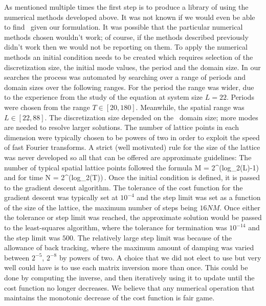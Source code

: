 As mentioned multiple times the first step is to produce a library of \twots using the numerical methods developed above.
It was not known if we would even be able to find \twots\ given our formulation. It was
possible that the particular numerical methods chosen wouldn't work; of course, if the methods
described previously didn't work then we would not be reporting on them. To apply the numerical methods
an initial condition needs to be created which requires selection of the discretization size, the initial mode values,
the period and the domain size. In our searches the process was automated by searching over a range
of periods and domain sizes over the following ranges. For the period the range was wider, due to the
experience from the study of the equation at system size $L=22$. Periods were chosen from the range
$T\in [20, 180]$. Meanwhile, the spatial range was $L \in [22, 88]$. The discretization size
depended on the \spt\ domain size; more modes are needed to resolve larger solutions. The number
of lattice points in each dimension were typically chosen to be powers of two in order to exploit
the speed of fast Fourier transforms. A strict (well motivated) rule for the size of the lattice
was never developed so all that can be offered are approximate guidelines: The number of typical
spatial lattice points followed the formula
\beq
M = 2^{(log_2(L)-1)}
\eeq
and for time
\beq
N = 2^{(log_2(T))}\,.
\eeq
Once the initial condition is defined, it is passed to the gradient descent algorithm.
The tolerance of the cost function for the gradient descent was typically set at $10^{-4}$
and the step limit was set as a function of the size of the lattice, the maximum number of
steps being $16NM$. Once either the tolerance or step limit was reached, the approximate
solution would be passed to the least-squares algorithm, where the tolerance for termination
was $10^{-14}$ and the step limit was $500$. The relatively large step limit was because of
the allowance of back tracking, where the maximum amount of damping was
varied between $2^{-5}$, $2^{-8}$ by powers of two. A choice that we did
not elect to use but very well could have is to use each matrix inversion more than once.
This could be done by computing the inverse, and then iteratively using it to update
until the cost function no longer decreases. We believe that any numerical operation
that maintains the monotonic decrease of the cost function is fair game.



